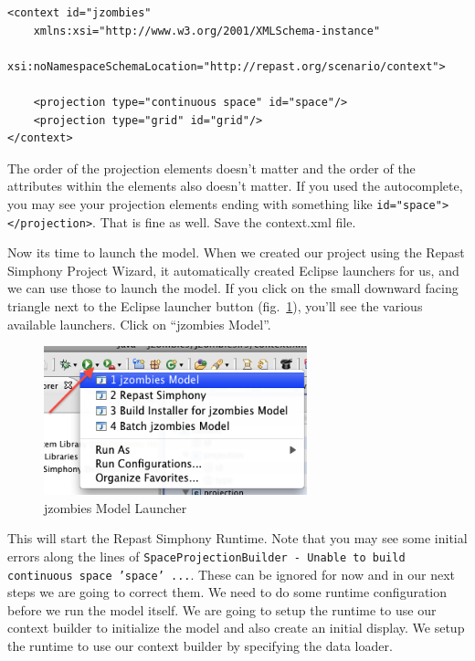 \documentclass[11pt]{amsart}
\begin{document}
\noindent\begin{minipage}[h]{\textwidth}
\vspace{.2in}
\lstset{language=java,caption=context.xml Complete }
\begin{lstlisting}
<context id="jzombies"
	xmlns:xsi="http://www.w3.org/2001/XMLSchema-instance"
	xsi:noNamespaceSchemaLocation="http://repast.org/scenario/context">
	
	<projection type="continuous space" id="space"/>
	<projection type="grid" id="grid"/>
</context>

\end{lstlisting}
\vspace{.2in}
\end{minipage}
The order of the projection elements doesn't matter and the order of the attributes within the elements also doesn't matter. If you used the autocomplete, you   may see your projection elements ending with something like \texttt{id="space"></projection>}. That is fine as well. Save the context.xml file.

Now its time to launch the model. When we created our project using the Repast Simphony Project Wizard, it automatically created Eclipse launchers for us, and we can use those to launch the model. If you click on the small downward facing triangle next to the Eclipse launcher button (fig.~\ref{fig:launch}), you'll see the various available launchers. Click on ``jzombies Model''.

\begin{figure}[h]
\begin{center}
\vspace{.2in}
\centerline {
\includegraphics[width=3in]{GettingStartedImages/launcher.png}
}
\caption{jzombies Model Launcher}
\label{fig:launch}
\end{center}
\end{figure}

This will start the Repast Simphony Runtime. Note that you may see some initial errors along the lines of \texttt{SpaceProjectionBuilder - Unable to build continuous space 'space' ...}. These can be ignored for now and in our next steps we are going to correct them. We need to do some runtime configuration before we run the model itself. We are going to setup the runtime to use our context builder to initialize the model and also create an initial display. We setup the runtime to use our context builder by specifying the data loader.
\end{document}
